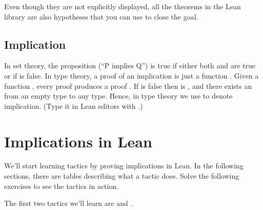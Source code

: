 \documentclass[letterpaper,10pt,english]{sphinxmanual}
\begin{document}
\sphinxAtStartPar
Even though they are not explicitly displayed,
all the theorems in the Lean library are also hypotheses that you can use to close the goal.


\subsection{Implication}
\label{\detokenize{day1:implication}}
\sphinxAtStartPar
In set theory, the proposition  (“P implies Q”) is true if either both  and  are true or if  is false.
In type theory, a proof of an implication  is just a function .
Given a function , every proof  produces a proof .
If  is false then  is , and there exists an  from an empty type to any type.
Hence, in type theory we use  to denote implication. (Type it in Lean editors with .)


\section{Implications in Lean}
\label{\detokenize{day1:implications-in-lean}}
\sphinxAtStartPar
We’ll start learning tactics by proving implications in Lean.
In the following sections, there are tables describing what a tactic does.
Solve the following exercises to see the tactics in action.

\sphinxAtStartPar
The first two tactics we’ll learn are  and .
\end{document}
